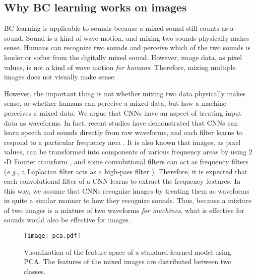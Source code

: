 \documentclass[10pt,twocolumn,letterpaper]{article}
\begin{document}
\subsection{Why BC learning works on images}\label{why}
BC learning is applicable to sounds because a mixed sound still counts as a sound. Sound is a kind of wave motion, and mixing two sounds physically makes sense. Humans can recognize two sounds and perceive which of the two sounds is louder or softer from the digitally mixed sound. However, image data, as pixel values, is not a kind of wave motion {\it for humans}. Therefore, mixing multiple images does not visually make sense. 

However, the important thing is not whether mixing two data physically makes sense, or whether humans can perceive a mixed data, but how a machine perceives a mixed data. We argue that CNNs have an aspect of treating input data as waveforms. In fact, recent studies have demonstrated that CNNs can learn speech and sounds directly from raw waveforms, and each filter learns to respond to a particular frequency area \cite{sainath2015learning, tokozume2017learning, dai2017very}. It is also known that images, as pixel values, can be transformed into components of various frequency areas by using $2$-D Fourier transform \cite{shanmugam1979optimal}, and some convolutional filters can act as frequency filters ({\it e.g.}, a Laplacian filter acts as a high-pass filter \cite{burt1983laplacian}). Therefore, it is expected that each convolutional filter of a CNN learns to extract the frequency features. In this way, we assume that CNNs recognize images by treating them as waveforms in quite a similar manner to how they recognize sounds. Thus, because a mixture of two images is a mixture of two waveforms {\it for machines}, what is effective for sounds would also be effective for images.

\begin{figure}
	\centering
	\texttt{[image: pca.pdf]}
	\vspace{-7mm}
	\caption{Visualization of the feature space of a standard-learned model using PCA. The features of the mixed images are distributed between two classes.}
	\label{fig:pca}
	\vspace{-2mm}
\end{figure}
\end{document}
